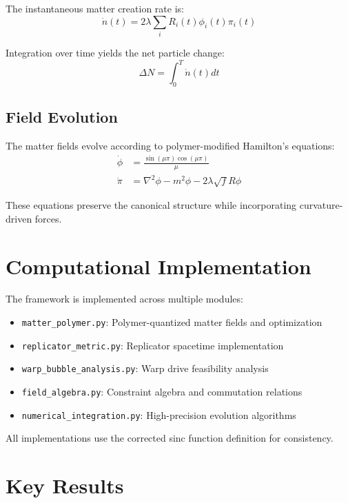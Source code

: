 \documentclass[11pt]{article}
\begin{document}
The instantaneous matter creation rate is:
\begin{equation}
\dot{n}(t) = 2\lambda \sum_i R_i(t) \phi_i(t) \pi_i(t)
\end{equation}

Integration over time yields the net particle change:
\begin{equation}
\Delta N = \int_0^T \dot{n}(t) dt
\end{equation}

\subsection{Field Evolution}

The matter fields evolve according to polymer-modified Hamilton's equations:
\begin{align}
\dot{\phi} &= \frac{\sin(\mu\pi)\cos(\mu\pi)}{\mu} \\
\dot{\pi} &= \nabla^2\phi - m^2\phi - 2\lambda\sqrt{f}R\phi
\end{align}

These equations preserve the canonical structure while incorporating curvature-driven forces.

\section{Computational Implementation}

The framework is implemented across multiple modules:

\begin{itemize}
\item \texttt{matter\_polymer.py}: Polymer-quantized matter fields and optimization
\item \texttt{replicator\_metric.py}: Replicator spacetime implementation
\item \texttt{warp\_bubble\_analysis.py}: Warp drive feasibility analysis
\item \texttt{field\_algebra.py}: Constraint algebra and commutation relations
\item \texttt{numerical\_integration.py}: High-precision evolution algorithms
\end{itemize}

All implementations use the corrected sinc function definition for consistency.

\section{Key Results}
\end{document}
